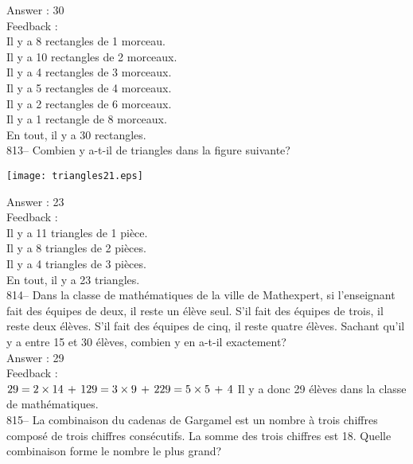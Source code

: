\documentclass[letterpaper, 12pt]{article}
\begin{document}
Answer : 30\\

Feedback : \\
Il y a 8 rectangles de 1 morceau.\\
Il y a 10 rectangles de 2 morceaux.\\
Il y a 4 rectangles de 3 morceaux.\\
Il y a 5 rectangles de 4 morceaux.\\
Il y a 2 rectangles de 6 morceaux.\\
Il y a 1 rectangle de 8 morceaux.\\
En tout, il y a 30 rectangles.\\

813-- Combien y a-t-il de triangles dans la figure suivante?\\
    \begin{center}
    \texttt{[image: triangles21.eps]}
    \end{center}

Answer : 23\\

Feedback : \\
Il y a 11 triangles de 1 pi\`ece.\\
Il y a 8 triangles de 2 pi\`eces.\\
Il y a 4 triangles de 3 pi\`eces.\\
En tout, il y a 23 triangles.\\

814--  Dans la classe de math\'ematiques de la ville de  Mathexpert, si
l'enseignant fait des \'equipes de deux, il reste un \'el\`eve seul.  S'il
fait des \'equipes de trois, il reste deux \'el\`eves.  S'il fait des
\'equipes de cinq, il reste quatre \'el\`eves. Sachant qu'il y a entre 15 et
30 \'el\`eves, combien y en a-t-il exactement?\\

Answer : 29\\

Feedback : \\
$29=2\times14\,+\,1\\
29=3\times9\,+\,2\\
29=5\times5\,+\,4\\$
Il y a donc 29 \'el\`eves dans la classe de math\'ematiques.  \\

815-- La combinaison du cadenas de Gargamel est un nombre \`a trois chiffres
compos\'e de trois chiffres cons\'ecutifs.  La somme des trois chiffres est
18.  Quelle combinaison forme le nombre le plus grand?\\
\end{document}
